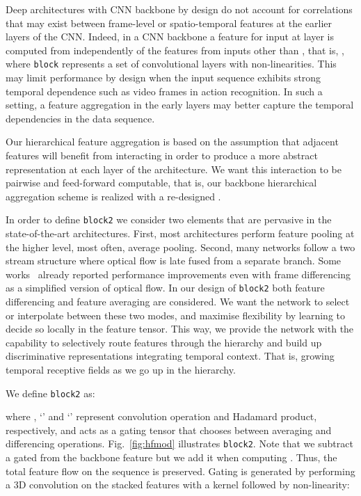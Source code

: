 \documentclass[journal,onecolumn]{IEEEtran}
\begin{document}
Deep architectures with CNN backbone by design do not account for correlations that
may exist between frame-level or spatio-temporal features at the earlier layers of the CNN.
Indeed, in a CNN backbone a feature  for input  at layer  is computed from  independently of the features from inputs other than , that is, , where \verb+block+ represents a set of convolutional layers with non-linearities. This may limit performance by design when the input sequence exhibits strong temporal dependence such as video frames in action recognition. In such a setting, a feature aggregation in the early layers may better capture the temporal dependencies in the data sequence.

Our hierarchical feature aggregation is based on the assumption that adjacent features will benefit from interacting in order to produce a more abstract representation at each layer of the architecture. We want this interaction to be pairwise and feed-forward computable, that is, our backbone hierarchical aggregation scheme is realized with a re-designed .

In order to define \verb+block2+ we consider two elements that are pervasive in the state-of-the-art architectures. First, most architectures perform feature pooling at the higher level, most often, average pooling. Second, many networks follow a two stream structure where optical flow is late fused from a separate branch. Some works~\cite{tsn, tdn} already reported performance improvements even with frame differencing as a simplified version of optical flow. In our design of \verb+block2+ both feature differencing and feature averaging are considered. We want the network to select or interpolate between these two modes, and maximise flexibility by learning to decide so locally in the feature tensor. This way, we provide the network with the capability to selectively route features through the hierarchy and build up discriminative representations integrating temporal context. That is, growing temporal receptive fields as we go up in the hierarchy. 

We define \verb+block2+ as:


where , `' and `' represent convolution operation and Hadamard product, respectively, and  acts as a gating tensor that chooses between averaging and differencing operations. Fig.~\ref{fig:hfmod} illustrates \verb+block2+. Note that we subtract a gated  from the backbone feature  but we add it when computing . Thus, the total feature flow on the sequence is preserved. Gating  is generated by performing a 3D convolution on the stacked features with a  kernel followed by  non-linearity:
\end{document}
